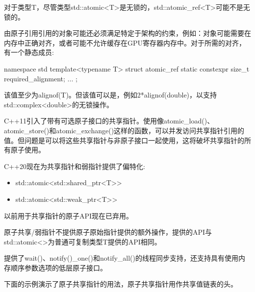 对于类型T，尽管类型std::atomic<T>是无锁的，std::atomic\_ref<T>可能不是无锁的。

由原子引用引用的对象可能还必须满足特定于架构的约束，例如：对象可能需要在内存中正确对齐，或者可能不允许缓存在GPU寄存器内存中。对于所需的对齐，有一个静态成员:

\begin{cpp}
namespace std {
	template<typename T> struct atomic_ref {
		static constexpr size_t required_alignment;
		...
	};
}
\end{cpp}

该值至少为alignof(T)。但该值可以是，例如2*alignof(double)，以支持std::complex<double>的无锁操作。


C++11引入了带有可选原子接口的共享指针。使用像atomic\_load()、atomic\_store()和atomic\_exchange()这样的函数，可以并发访问共享指针引用的值。但问题是可以将这些共享指针与非原子接口一起使用，这将破坏共享指针的所有原子使用。

C++20现在为共享指针和弱指针提供了偏特化:

\begin{itemize}
\item
std::atomic<std::shared\_ptr<T>{}>

\item
std::atomic<std::weak\_ptr<T>{}>
\end{itemize}

以前用于共享指针的原子API现在已弃用。

原子共享/弱指针不提供原子原始指针提供的额外操作，提供的API与std::atomic<>为普通可复制类型T提供的API相同。

提供了wait()、notify()\_one()和notify\_all()的线程同步支持，还支持具有使用内存顺序参数选项的低层原子接口。


下面的示例演示了原子共享指针的用法，原子共享指针用作共享值链表的头。


